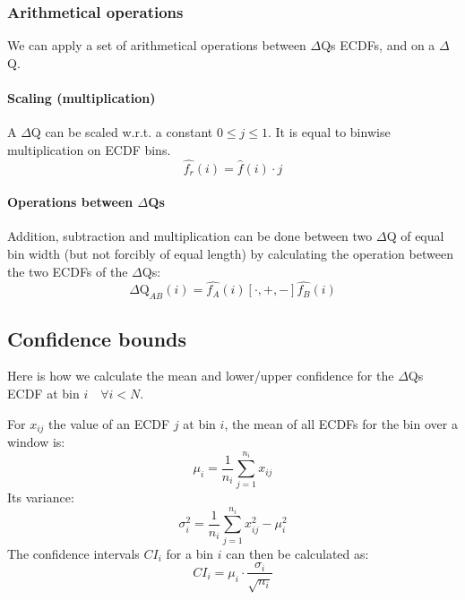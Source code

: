     \subsubsection{Arithmetical operations}
        We can apply a set of arithmetical operations between $\Delta$Qs ECDFs, and on a $\Delta$Q.
    \paragraph{Scaling (multiplication)} A $\Delta$Q can be scaled w.r.t. a constant $0 \le j \le 1$. It is equal to binwise multiplication on ECDF bins.
    \begin{equation}
        \hat{f_r}(i) = \hat{f}(i) \cdot j
        \label{eq:mul_ecdf}
    \end{equation}

    \paragraph{Operations between $\Delta$Qs} 
        Addition, subtraction and multiplication can be done between two $\Delta$Q of equal bin width (but not forcibly of equal length) by calculating the operation between the two ECDFs of the $\Delta$Qs:
        \begin{equation}
            \Delta \text{Q}_{AB}(i) = \hat{f_A}(i) [\cdot, +, -] \hat{f_B}(i)
            \label{eq:op_dq}
        \end{equation}


    \subsection{Confidence bounds}
        Here is how we calculate the mean and lower/upper confidence for the $\Delta$Qs ECDF at bin $i \quad \forall i < N$. \cite{stat}

        For $x_{ij}$ the value of an ECDF $j$ at bin $i$, the mean of all ECDFs for the bin over a window is:
            \begin{equation}
                \mu_i = \dfrac{1}{n_i} \sum_{j=1}^{n_i} x_{ij}
                \label{eq:mean_ecdf}
            \end{equation}
        Its variance:
            \begin{equation}
                \sigma^2_i = \dfrac{1}{n_i} \sum_{j=1}^{n_i} x^2_{ij} - \mu^2_i
                \label{eq:var_ecdf}
            \end{equation}
        The confidence intervals $CI_i$ for a bin $i$ can then be calculated as:
        \begin{equation}
            CI_i = \mu_i \cdot \dfrac{\sigma_i}{\sqrt{n_i}}      
            \label{eq:ci_i}
        \end{equation}

